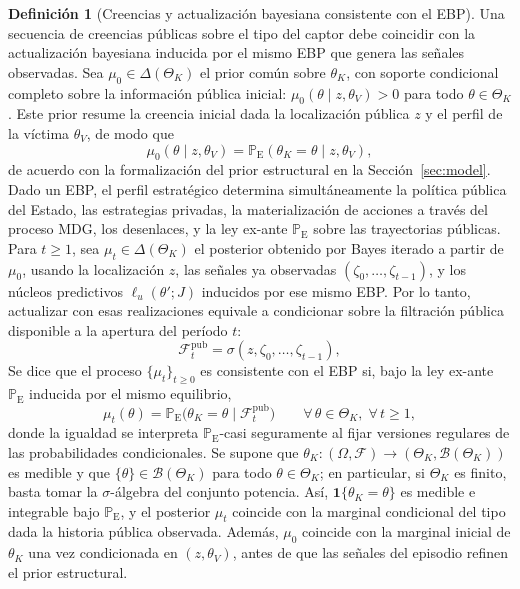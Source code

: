 \documentclass[review,authoryear,12pt]{elsarticle}
\theoremstyle{plain}
\theoremstyle{definition}
\newtheorem{definition}[theorem]{Definición}
\newcommand{\ProbE}{\mathbb{P}_{\mathrm{E}}}
\newcommand{\ThetaK}{\Theta_K}
\newcommand{\1}{\mathbf{1}}
\begin{document}
\begin{definition}[Creencias y actualización bayesiana consistente con el EBP]\label{def:beliefs-martingale}
Una secuencia de creencias públicas sobre el tipo del captor debe coincidir con la actualización bayesiana inducida por el mismo EBP que genera las señales observadas. Sea $\mu_0\in\Delta(\ThetaK)$ el prior común sobre $\theta_K$, con soporte condicional completo sobre la información pública inicial: $\mu_0(\theta \mid z,\theta_V)>0$ para todo $\theta\in\ThetaK$. Este prior resume la creencia inicial dada la localización pública $z$ y el perfil de la víctima $\theta_V$, de modo que
\[
\mu_0(\theta \mid z,\theta_V)=\ProbE(\theta_K=\theta\mid z,\theta_V),
\]
de acuerdo con la formalización del prior estructural en la Sección~\ref{sec:model}. Dado un EBP, el perfil estratégico determina simultáneamente la política pública del Estado, las estrategias privadas, la materialización de acciones a través del proceso MDG, los desenlaces, y la ley ex-ante $\ProbE$ sobre las trayectorias públicas. Para $t\ge 1$, sea $\mu_t\in\Delta(\ThetaK)$ el posterior obtenido por Bayes iterado a partir de $\mu_0$, usando la localización $z$, las señales ya observadas $(\zeta_0,\ldots,\zeta_{t-1})$, y los núcleos predictivos $\ell_u(\theta';J)$ inducidos por ese mismo EBP. Por lo tanto, actualizar con esas realizaciones equivale a condicionar sobre la filtración pública disponible a la apertura del período $t$:
\[
\mathcal{F}_t^{\mathrm{pub}}=\sigma(z,\zeta_0,\ldots,\zeta_{t-1}),
\]
Se dice que el proceso $\{\mu_t\}_{t\ge 0}$ es consistente con el EBP si, bajo la ley ex-ante $\ProbE$ inducida por el mismo equilibrio,
\begin{equation}
\label{eq:beliefs-ebp-consistency}
\mu_t(\theta)=\ProbE\bigl(\theta_K=\theta\mid\mathcal{F}_t^{\mathrm{pub}}\bigr)\qquad \forall\,\theta\in\ThetaK,\;\forall\,t\ge 1,
\end{equation}
donde la igualdad se interpreta $\ProbE$-casi seguramente al fijar versiones regulares de las probabilidades condicionales. Se supone que $\theta_K:(\Omega,\mathcal{F})\to(\ThetaK,\mathcal{B}(\ThetaK))$ es medible y que $\{\theta\}\in\mathcal{B}(\ThetaK)$ para todo $\theta\in\ThetaK$; en particular, si $\ThetaK$ es finito, basta tomar la $\sigma$-álgebra del conjunto potencia. Así, $\mathbf{1}\{\theta_K=\theta\}$ es medible e integrable bajo $\ProbE$, y el posterior $\mu_t$ coincide con la marginal condicional del tipo dada la historia pública observada. Además, $\mu_0$ coincide con la marginal inicial de $\theta_K$ una vez condicionada en $(z, \theta_V)$, antes de que las señales del episodio refinen el prior estructural.
\end{definition}
\end{document}
